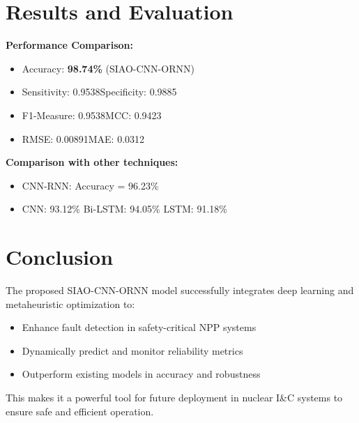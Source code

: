 \documentclass[12pt]{article}
\begin{document}
\section*{Results and Evaluation}
\textbf{Performance Comparison:}
\begin{itemize}
    \item Accuracy: \textbf{98.74\%} (SIAO-CNN-ORNN)
    \item Sensitivity: 0.9538\quad Specificity: 0.9885
    \item F1-Measure: 0.9538\quad MCC: 0.9423
    \item RMSE: 0.00891\quad MAE: 0.0312
\end{itemize}

\textbf{Comparison with other techniques:}
\begin{itemize}
    \item CNN-RNN: Accuracy = 96.23\%
    \item CNN: 93.12\% \quad Bi-LSTM: 94.05\% \quad LSTM: 91.18\%
\end{itemize}

\section*{Conclusion}
The proposed SIAO-CNN-ORNN model successfully integrates deep learning and metaheuristic optimization to:
\begin{itemize}
    \item Enhance fault detection in safety-critical NPP systems
    \item Dynamically predict and monitor reliability metrics
    \item Outperform existing models in accuracy and robustness
\end{itemize}
This makes it a powerful tool for future deployment in nuclear I\&C systems to ensure safe and efficient operation.
\end{document}
